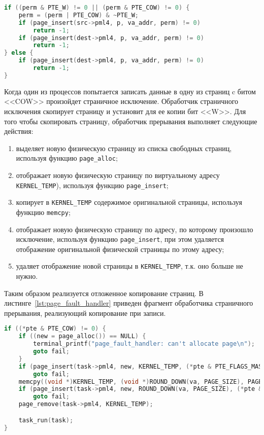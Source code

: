 \begin{lstlisting}[language=C,
caption={Отображение страниц для реализации копирования при записи},
label={lst:remap_cow}]
if ((perm & PTE_W) != 0 || (perm & PTE_COW) != 0) {
	perm = (perm | PTE_COW) & ~PTE_W;
	if (page_insert(src->pml4, p, va_addr, perm) != 0)
		return -1;
	if (page_insert(dest->pml4, p, va_addr, perm) != 0)
		return -1;
} else {
	if (page_insert(dest->pml4, p, va_addr, perm) != 0)
		return -1;
}
\end{lstlisting}

Когда один из процессов попытается записать данные в одну из страниц c битом <<COW>> произойдет страничное
исключение. Обработчик страничного исключения скопирует страницу и установит для ее копии бит <<W>>. Для
того чтобы скопировать страницу, обработчик прерывания выполняет следующие действия:
\begin{enumerate}[1.]
\item выделяет новую физическую страницу из списка свободных страниц, используя функцию \texttt{page\_alloc};
\item отображает новую физическую страницу по виртуальному адресу \texttt{KERNEL\_TEMP}), используя функцию \texttt{page\_insert};
\item копирует в \texttt{KERNEL\_TEMP} содержимое оригинальной страницы, используя функцию \texttt{memcpy};
\item отображает новую физическую страницу по адресу, по которому произошло исключение, используя функцию \texttt{page\_insert},
	при этом удаляется отображение оригинальной физической страницы по этому адресу;
\item удаляет отображение новой страницы в \texttt{KERNEL\_TEMP}, т.к. оно больше не нужно.
\end{enumerate}

Таким образом реализуется отложенное копирование страниц. В листинге~\ref{lst:page_fault_handler}
приведен фрагмент обработчика страничного прерывания, реализующий копирование при записи.

\begin{lstlisting}[language=C,
caption={Фрагмент обработчика страничного исключения},
label={lst:page_fault_handler}]
if ((*pte & PTE_COW) != 0) {
	if ((new = page_alloc()) == NULL) {
		terminal_printf("page_fault_handler: can't allocate page\n");
		goto fail;
	}
	if (page_insert(task->pml4, new, KERNEL_TEMP, (*pte & PTE_FLAGS_MASK)| PTE_W) != 0)
		goto fail;
	memcpy((void *)KERNEL_TEMP, (void *)ROUND_DOWN(va, PAGE_SIZE), PAGE_SIZE);
	if (page_insert(task->pml4, new, ROUND_DOWN(va, PAGE_SIZE), (*pte & PTE_FLAGS_MASK) | PTE_W) != 0)
		goto fail;
	page_remove(task->pml4, KERNEL_TEMP);

	task_run(task);
}
\end{lstlisting}


